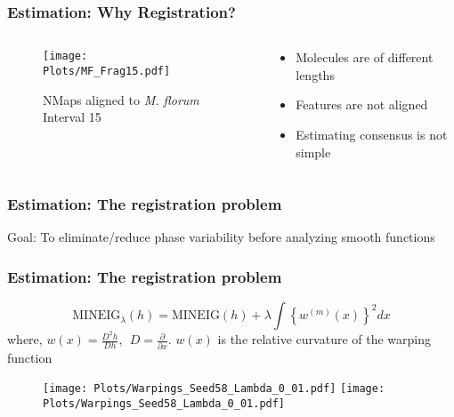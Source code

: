 \documentclass[10pt,dvipsnames,table]{beamer}
\begin{document}
\begin{frame}
\frametitle{Estimation: Why Registration?}
\begin{columns}
\begin{column}{0.5\textwidth}
\begin{figure}[H]
\begin{center}
\texttt{[image: Plots/MF\_Frag15.pdf]}
\end{center}
\caption{NMaps aligned to {\emph{M. florum}} Interval 15}
\end{figure}
\end{column}
\begin{column}{0.5\textwidth}
\begin{itemize}
\item Molecules are of different lengths
\vspace{1cm}
\item Features are not aligned
\vspace{1cm}
\item Estimating consensus is not simple
\end{itemize}
\end{column}
\end{columns}
\end{frame}

\begin{frame}
\frametitle{Estimation: The registration problem}
\Large
Goal: To eliminate/reduce phase variability before analyzing smooth functions

\end{frame}

\begin{frame}
\frametitle{Estimation: The registration problem}
\footnotesize
\begin{equation}
\text{MINEIG}_{\lambda}(h) = \text{MINEIG}(h) + \lambda \displaystyle \int \left\{ w^{(m)}(x) \right\}^2 dx
\end{equation}
where, $w(x) = \frac{D^2h}{Dh},\ \ D = \frac{\partial}{\partial x}$. $w(x)$ is the relative curvature of the warping function

\begin{figure}[H]
\texttt{[image: Plots/Warpings\_Seed58\_Lambda\_0\_01.pdf]}
\texttt{[image: Plots/Warpings\_Seed58\_Lambda\_0\_01.pdf]}
\end{figure}


\end{frame}
\end{document}
